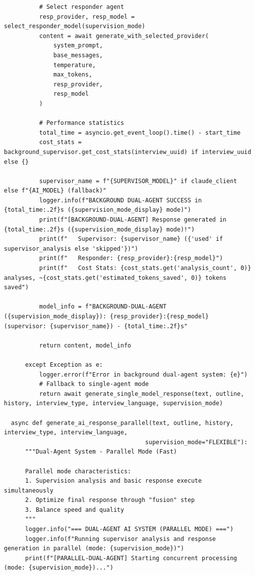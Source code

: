 \documentclass[sigchi,nonacm,manuscript]{acmart}
\begin{document}
\begin{lstlisting}
          # Select responder agent
          resp_provider, resp_model = select_responder_model(supervision_mode)
          content = await generate_with_selected_provider(
              system_prompt,
              base_messages,
              temperature,
              max_tokens,
              resp_provider,
              resp_model
          )
          
          # Performance statistics
          total_time = asyncio.get_event_loop().time() - start_time
          cost_stats = background_supervisor.get_cost_stats(interview_uuid) if interview_uuid else {}
          
          supervisor_name = f"{SUPERVISOR_MODEL}" if claude_client else f"{AI_MODEL} (fallback)"
          logger.info(f"BACKGROUND DUAL-AGENT SUCCESS in {total_time:.2f}s ({supervision_mode_display} mode)")
          print(f"[BACKGROUND-DUAL-AGENT] Response generated in {total_time:.2f}s ({supervision_mode_display} mode)!")
          print(f"   Supervisor: {supervisor_name} ({'used' if supervisor_analysis else 'skipped'})")
          print(f"   Responder: {resp_provider}:{resp_model}")
          print(f"   Cost Stats: {cost_stats.get('analysis_count', 0)} analyses, ~{cost_stats.get('estimated_tokens_saved', 0)} tokens saved")
          
          model_info = f"BACKGROUND-DUAL-AGENT ({supervision_mode_display}): {resp_provider}:{resp_model} (supervisor: {supervisor_name}) - {total_time:.2f}s"
          
          return content, model_info
          
      except Exception as e:
          logger.error(f"Error in background dual-agent system: {e}")
          # Fallback to single-agent mode
          return await generate_single_model_response(text, outline, history, interview_type, interview_language, supervision_mode)

  async def generate_ai_response_parallel(text, outline, history, interview_type, interview_language, 
                                        supervision_mode="FLEXIBLE"):
      """Dual-Agent System - Parallel Mode (Fast)
      
      Parallel mode characteristics:
      1. Supervision analysis and basic response execute simultaneously
      2. Optimize final response through "fusion" step
      3. Balance speed and quality
      """
      logger.info("=== DUAL-AGENT AI SYSTEM (PARALLEL MODE) ===")
      logger.info(f"Running supervisor analysis and response generation in parallel (mode: {supervision_mode})")
      print(f"[PARALLEL-DUAL-AGENT] Starting concurrent processing (mode: {supervision_mode})...")
      

\end{lstlisting}
\end{document}

